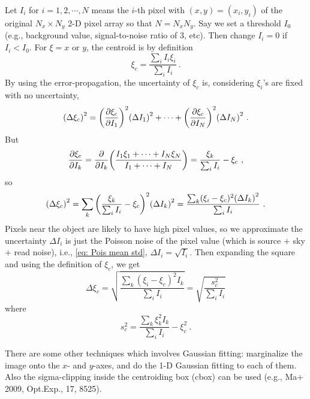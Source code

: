 
Let $ I_i $ for $ i = 1, 2, \cdots , N $ means the $ i $-th pixel with $ (x, y) = (x_i, y_i) $ of the original $ N_x \times N_y $ 2-D pixel array so that $ N = N_x N_y $. Say we set a threshold $ I_0 $ (e.g., background value, signal-to-noise ratio of 3, etc). Then change $ I_i = 0 $ if $ I_i < I_0 $. For $ \xi = x $ or $ y $, the centroid is by definition
\begin{equation} \label{eq: centroid}
  \xi_c = \frac{\sum_i I_i \xi_i}{\sum_i I_i} ~.
\end{equation}
By using the error-propagation, the uncertainty of $ \xi_c $ is, considering $ \xi_i $'s are fixed with no uncertainty,
\begin{equation}
  \qty (\Delta \xi_c)^2
    = \qty(\pdv{\xi_c}{I_1})^2 \qty(\Delta I_1)^2 
      + \cdots + \qty(\pdv{\xi_c}{I_N})^2 \qty(\Delta I_N)^2 ~.
\end{equation}
But
\begin{equation}
  \pdv{\xi_c}{I_k} 
    = \pdv{I_k} \qty( \frac{I_1 \xi_1 + \cdots + I_N \xi_N}{I_1 + \cdots + I_N} )
    = \frac{\xi_k}{\sum_i I_i} - \xi_c ~,
\end{equation}
so
\begin{equation}
  \qty (\Delta \xi_c)^2
  = \sum_k \qty(\frac{\xi_k}{\sum_i I_i} - \xi_c)^2 \qty(\Delta I_k)^2
  = \frac{\sum_k (\xi_i - \xi_c)^2 \qty(\Delta I_k)^2}{\sum_i I_i} ~.
\end{equation}
Pixels near the object are likely to have high pixel values, so we approximate the uncertainty $ \Delta I_i $ is just the Poisson noise of the pixel value (which is source $ + $ sky $ + $ read noise), i.e., \cref{eq: Pois mean std}, $ \Delta I_i = \sqrt{I_i} $. Then expanding the square and using the definition of $ \xi_c $, we get
\begin{equation} \label{eq: centroid err}
  \Delta \xi_c 
  = \sqrt{\frac{\sum_k (\xi_i - \xi_c)^2 I_k }{\sum_i I_i} }
  = \sqrt{\frac{s_c^2}{\sum_i I_i}}
\end{equation}
where
\begin{equation}
  s_c^2 = \frac{\sum_k \xi_k^2 I_k}{\sum_i I_i} - \xi_c^2 ~.
\end{equation}


There are some other techniques which involves Gaussian fitting: marginalize the image onto the $ x $- and $ y $-axes, and do the 1-D Gaussian fitting to each of them. Also the sigma-clipping inside the centroiding box (cbox) can be used (e.g., Ma+ 2009, Opt.Exp., 17, 8525).

